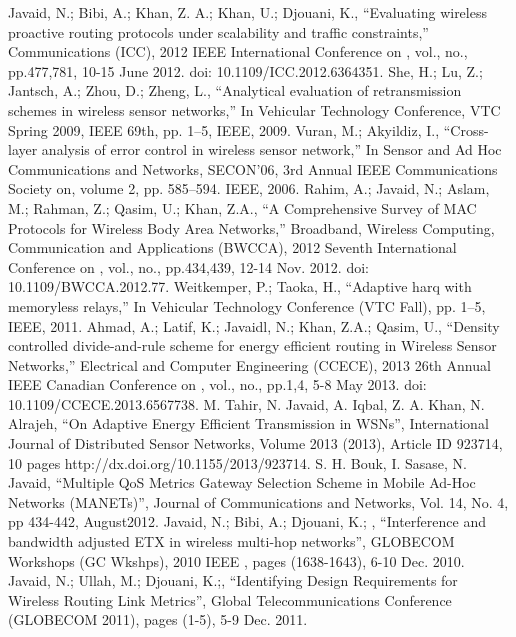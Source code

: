 \documentclass{sig-alternate}
\begin{document}
\begin{thebibliography}{1}
Javaid, N.; Bibi, A.; Khan, Z. A.; Khan, U.; Djouani, K., ``Evaluating wireless proactive routing protocols under scalability and traffic constraints,'' Communications (ICC), 2012 IEEE International Conference on , vol., no., pp.477,781, 10-15 June 2012. doi: 10.1109/ICC.2012.6364351.
She, H.; Lu, Z.; Jantsch, A.; Zhou, D.; Zheng, L., ``Analytical evaluation of retransmission schemes in wireless sensor networks,'' In Vehicular Technology Conference, VTC Spring 2009, IEEE 69th, pp. 1–5, IEEE, 2009.
Vuran, M.; Akyildiz, I., ``Cross-layer analysis of error control in wireless sensor network,'' In Sensor and Ad Hoc Communications and Networks, SECON’06, 3rd Annual IEEE Communications Society on, volume 2, pp. 585–594. IEEE, 2006.
Rahim, A.; Javaid, N.; Aslam, M.; Rahman, Z.; Qasim, U.; Khan, Z.A., ``A Comprehensive Survey of MAC Protocols for Wireless Body Area Networks,'' Broadband, Wireless Computing, Communication and Applications (BWCCA), 2012 Seventh International Conference on , vol., no., pp.434,439, 12-14 Nov. 2012.
doi: 10.1109/BWCCA.2012.77.
Weitkemper, P.; Taoka, H., ``Adaptive harq with memoryless relays,'' In Vehicular Technology Conference (VTC Fall), pp. 1–5, IEEE, 2011.
Ahmad, A.; Latif, K.; Javaidl, N.; Khan, Z.A.; Qasim, U., ``Density controlled divide-and-rule scheme for energy efficient routing in Wireless Sensor Networks,'' Electrical and Computer Engineering (CCECE), 2013 26th Annual IEEE Canadian Conference on , vol., no., pp.1,4, 5-8 May 2013. doi: 10.1109/CCECE.2013.6567738.
M. Tahir, N. Javaid, A. Iqbal, Z. A. Khan, N. Alrajeh, “On Adaptive Energy Efficient Transmission in WSNs”, International Journal of Distributed Sensor Networks, Volume 2013 (2013), Article ID 923714, 10 pages http://dx.doi.org/10.1155/2013/923714.
S. H. Bouk, I. Sasase, N. Javaid, “Multiple QoS Metrics Gateway Selection Scheme in Mobile Ad-Hoc Networks (MANETs)”, Journal of Communications and Networks, Vol. 14, No. 4, pp 434-442, August2012.
Javaid, N.; Bibi, A.; Djouani, K.; , ``Interference and bandwidth adjusted ETX in wireless multi-hop networks'', GLOBECOM Workshops (GC Wkshps), 2010 IEEE , pages (1638-1643), 6-10 Dec. 2010.
Javaid, N.; Ullah, M.; Djouani, K.;, ``Identifying Design Requirements for Wireless Routing Link Metrics'', Global Telecommunications Conference (GLOBECOM 2011), pages (1-5), 5-9 Dec. 2011.
\end{thebibliography}
\end{document}
